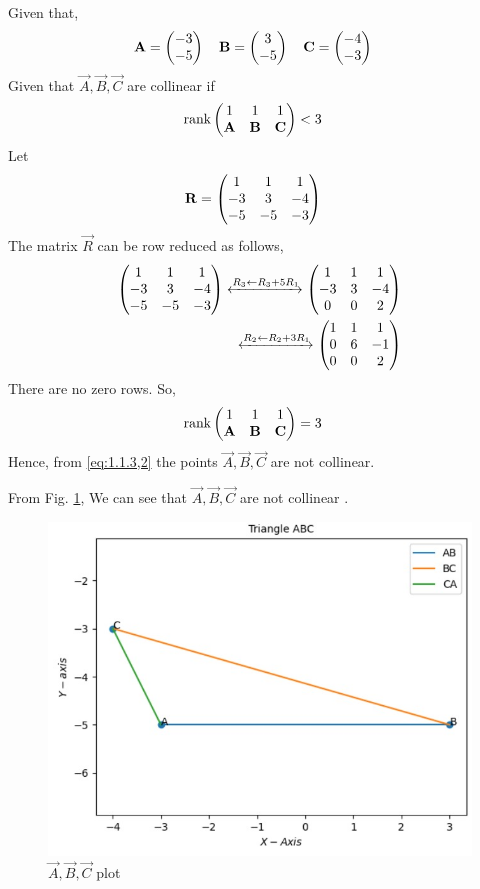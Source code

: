 \solution 
Given that,
\begin{align}
    \mathbf{A} = \begin{pmatrix}-3\\-5\end{pmatrix}
    \quad
    \mathbf{B} &= \begin{pmatrix}3\\-5\end{pmatrix}
    \quad
    \mathbf{C} = \begin{pmatrix}-4\\-3\end{pmatrix}
\end{align}
Given that $\vec{A},\vec{B},\vec{C}$ are collinear if
\begin{align}
    \text{rank}\myvec{
    1 & 1 & 1\\
    \vec{A} & \vec{B} & \vec{C} \\
    } &< 3 
    \label{eq:1.1.3,2}
\end{align} 
Let
\begin{align}
    \mathbf{R}&=\begin{pmatrix}
    1 & 1 & 1
    \\
    -3 & 3 & -4
    \\
    -5 & -5 & -3
    \end{pmatrix} 
\end{align} 
The matrix $\vec{R}$ can be row reduced as follows,
\begin{align}
    \label{eq:matthrowoperations}
    \myvec{
    1 & 1 & 1
    \\
    -3 & 3 & -4
    \\
    -5 & -5 & -3
    }
     \xleftrightarrow[]{R_3 \leftarrow R_3+5R_1}
    \myvec{
    1 & 1 & 1
    \\
    -3 & 3 & -4
    \\
    0 & 0 & 2 
    }
    \\
     \xleftrightarrow[]{R_2\leftarrow R_2+3R_1}
    \myvec{
    1 & 1 & 1
    \\
    0 & 6 & -1
    \\
    0 & 0 & 2 
    }
\end{align}
There are no zero rows. So,
\begin{align}
    \text{rank}\begin{pmatrix}
    1 & 1 & 1\\
    \mathbf{A} & \mathbf{B} & \mathbf{C} \\
    \end{pmatrix} &= 3 
\end{align}  
Hence, from \eqref{eq:1.1.3,2} the points $\vec{A},\vec{B},\vec{C}$ are not collinear. 

From Fig. \ref{fig1:Triangle}, We can see that $\vec{A},\vec{B},\vec{C}$ are not collinear .
\begin{figure}[h]
\centering
\includegraphics[width=\columnwidth]{figs/collinear.jpg}
\caption{$\vec{A},\vec{B},\vec{C}$ plot}
\label{fig1:Triangle}
\end{figure}

